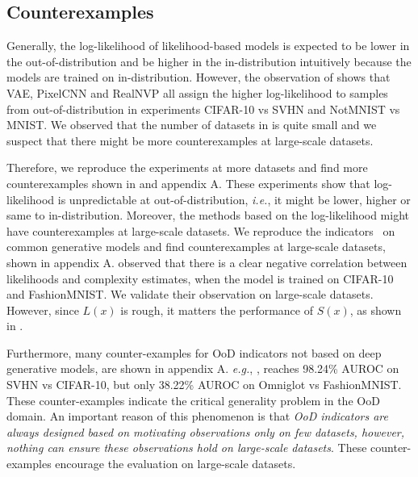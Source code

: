 \documentclass[letterpaper]{article} %
\newcommand{\IE}{\textit{i.e.}, }
\newcommand{\EG}{\textit{e.g.}, }
\begin{document}
\subsection{Counterexamples}
Generally, the log-likelihood of likelihood-based models is expected to be lower in the out-of-distribution and be higher in the in-distribution intuitively because the models are trained on in-distribution. 
However, the observation of \cite{nalisnick2019do} shows that VAE, PixelCNN and RealNVP all assign the higher log-likelihood to samples from out-of-distribution in experiments CIFAR-10 vs SVHN and NotMNIST vs MNIST. 
We observed that the number of datasets in \cite{nalisnick2019do} is quite small and we suspect that there might be more counterexamples at large-scale datasets. 

Therefore, we reproduce the experiments at more datasets and find more counterexamples shown in  and appendix A. 
These experiments show that log-likelihood is unpredictable at out-of-distribution, \IE it might be lower, higher or same to in-distribution. 
Moreover, the methods based on the log-likelihood might have counterexamples at large-scale datasets. 
We reproduce the indicators~\cite{alemi2018uncertainty,song2017pixeldefend,ren2019likelihood,song2019generative,nalisnick2019do,che2019deep,alemi2018uncertainty} on common generative models and find counterexamples at large-scale datasets, shown in appendix A. \cite{nalisnick2019do} observed that there is a clear negative correlation between likelihoods and complexity estimates, when the model is trained on CIFAR-10 and FashionMNIST. We validate their observation on large-scale datasets. However, since $L(x)$ is rough, it matters the performance of $S(x)$, as shown in .
 
Furthermore, many counter-examples for OoD indicators not based on deep generative models, are shown in appendix A. \EG, \cite{lee2018simple} reaches 98.24\% AUROC on SVHN vs CIFAR-10, but only 38.22\% AUROC on Omniglot vs FashionMNIST. These counter-examples indicate the critical generality problem in the OoD domain. An important reason of this phenomenon is that \textit{OoD indicators are always designed based on motivating observations only on few datasets, however, nothing can ensure these observations hold on large-scale datasets}. These counter-examples encourage the evaluation on large-scale datasets. 
\end{document}
